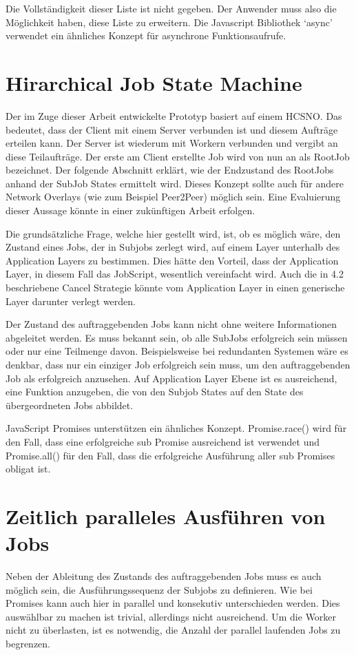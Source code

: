 Die Vollständigkeit dieser Liste ist nicht gegeben.
Der Anwender muss also die Möglichkeit haben, diese Liste zu erweitern.
Die Javascript Bibliothek ‘async’ verwendet ein ähnliches Konzept für asynchrone Funktionsaufrufe.




\section{Hirarchical Job State Machine}
Der im Zuge dieser Arbeit entwickelte Prototyp basiert auf einem HCSNO.
Das bedeutet, dass der Client mit einem Server verbunden ist und diesem Aufträge erteilen kann.
Der Server ist wiederum mit Workern verbunden und vergibt an diese Teilaufträge.
Der erste am Client erstellte Job wird von nun an als RootJob bezeichnet.
Der folgende Abschnitt erklärt, wie der Endzustand des RootJobs anhand der SubJob States ermittelt wird.
Dieses Konzept sollte auch für andere Network Overlays (wie zum Beispiel Peer2Peer) möglich sein.
Eine Evaluierung dieser Aussage könnte in einer zukünftigen Arbeit erfolgen.

Die grundsätzliche Frage, welche hier gestellt wird, ist, ob es möglich wäre, den Zustand eines Jobs, der in Subjobs zerlegt wird, auf einem Layer unterhalb des Application Layers zu bestimmen.
Dies hätte den Vorteil, dass der Application Layer, in diesem Fall das JobScript, wesentlich vereinfacht wird.
Auch die in 4.2 beschriebene Cancel Strategie könnte vom Application Layer in einen generische Layer darunter verlegt werden.

Der Zustand des auftraggebenden Jobs kann nicht ohne weitere Informationen abgeleitet werden.
Es muss bekannt sein, ob alle SubJobs erfolgreich sein müssen oder nur eine Teilmenge davon.
Beispielsweise bei redundanten Systemen wäre es denkbar, dass nur ein einziger Job erfolgreich sein muss, um den auftraggebenden Job als erfolgreich anzusehen.
Auf Application Layer Ebene ist es ausreichend, eine Funktion anzugeben, die von den Subjob States auf den State des übergeordneten Jobs abbildet.

JavaScript Promises unterstützen ein ähnliches Konzept.
Promise.race() wird für den Fall, dass eine erfolgreiche sub Promise ausreichend ist verwendet und Promise.all() für den Fall, dass die erfolgreiche Ausführung aller sub Promises obligat ist.





\section{Zeitlich paralleles Ausführen von Jobs}
Neben der Ableitung des Zustands des auftraggebenden Jobs muss es auch möglich sein, die Ausführungssequenz der Subjobs zu definieren.
Wie bei Promises kann auch hier in parallel und konsekutiv unterschieden werden.
Dies auswählbar zu machen ist trivial, allerdings nicht ausreichend.
Um die Worker nicht zu überlasten, ist es notwendig, die Anzahl der parallel laufenden Jobs zu begrenzen.
